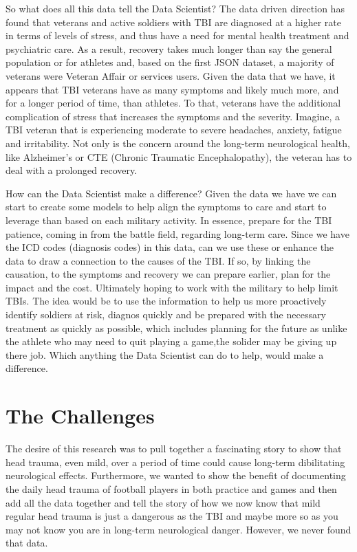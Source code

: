 \documentclass[sigconf]{acmart}
\begin{document}
So what does all this data tell the Data Scientist?  The data driven direction has found that veterans and active soldiers with TBI are diagnosed at a higher rate in terms of levels of stress, and thus have a need for mental health treatment and psychiatric care.  As a result, recovery takes much longer than say the general population or for athletes and, based on the first JSON dataset, a majority of veterans were Veteran Affair or services users.  Given the data that we have, it appears that TBI veterans have as many symptoms and likely much more, and for a longer period of time, than athletes.  To that, veterans have the additional complication of stress that increases the symptoms and the severity.  Imagine, a TBI veteran that is experiencing moderate to severe headaches, anxiety, fatigue and irritability.  Not only is the concern around the long-term neurological health, like Alzheimer's or CTE (Chronic Traumatic Encephalopathy), the veteran has to deal with a prolonged recovery.  

How can the Data Scientist make a difference?  Given the data we have we can start to create some models to help align the symptoms to care and start to leverage than based on each military activity.  In essence, prepare for the TBI patience, coming in from the battle field, regarding long-term care.  Since we have the ICD codes (diagnosis codes) in this data, can we use these or enhance the data to draw a connection to the causes of the TBI.  If so, by linking the causation, to the symptoms and recovery we can prepare earlier, plan for the impact and the cost.  Ultimately hoping to work with the military to help limit TBIs.  The idea would be to use the information to help us more proactively identify soldiers at risk, diagnos quickly and be prepared with the necessary treatment as quickly as possible, which includes planning for the future as unlike the athlete who may need to quit playing a game,the solider may be giving up there job.  Which anything the Data Scientist can do to help, would make a difference.


\section{The Challenges}

The desire of this research was to pull together a fascinating story to show that head trauma, even mild, over a period of time could cause long-term dibilitating neurological effects.  Furthermore, we wanted to show the benefit of documenting the daily head trauma of football players in both practice and games and then add all the data together and tell the story of how we now know that mild regular head trauma is just a dangerous as the TBI and maybe more so as you may not know you are in long-term neurological danger.  However, we never found that data.  
\end{document}
